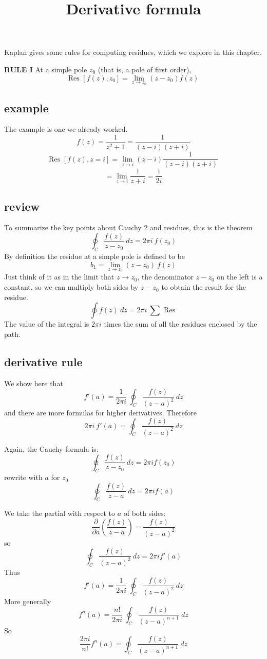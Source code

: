 \documentclass[11pt, oneside]{article}   	%
\title{Derivative formula}
\date{}							%
\begin{document}
\maketitle
\Large

Kaplan gives some rules for computing residues, which we explore in this chapter.

\textbf{RULE I}  At a simple pole $z_0$ (that is, a pole of first order),
\[ \text{Res } [f(z),z_0] = \lim_{z \rightarrow z_0} (z-z_0) f(z) \]

\subsection*{example}
The example is one we already worked.
\[ f(z) = \frac{1}{z^2 + 1} = \frac{1}{(z - i)(z + i)} \]
\[ \text{Res } [f(z),z=i] = \lim_{z \rightarrow i} (z-i) \frac{1}{(z - i)(z + i)} \]
\[ = \lim_{z \rightarrow i} \frac{1}{z + i} = \frac{1}{2i} \]

\subsection*{review}

To summarize the key points about Cauchy 2 and residues, this is the theorem
\[ \oint_C \frac{f(z)}{z - z_0} \ dz = 2 \pi i \ f(z_0) \]
By definition the residue at a simple pole is defined to be
\[ b_1 = \lim_{z \rightarrow z_0} (z-z_0) \ f(z)  \]
Just think of it as in the limit that $z \rightarrow z_0$, the denominator $z-z_0$ on the left is a constant, so we can multiply both sides by $z - z_0$ to obtain the result for the residue.
\[ \oint f(z) \ dz = 2 \pi i \ \sum \text{ Res } \]
The value of the integral is $2 \pi i$ times the sum of all the residues enclosed by the path.

\subsection*{derivative rule}

We show here that
\[ f'(a) = \frac{1}{2 \pi i} \ \oint_C \frac{f(z)}{(z-a)^2} \ dz \]
and there are more formulas for higher derivatives.
Therefore
\[ 2 \pi i \ f'(a) =  \oint_C \frac{f(z)}{(z-a)^2} \ dz \]

Again, the Cauchy formula is:
\[ \oint_C \frac{f(z)}{z-z_0} \ dz = 2 \pi i f(z_0) \]
rewrite with $a$ for $z_0$
\[ \oint_C \frac{f(z)}{z-a} \ dz = 2 \pi i f(a) \]

We take the partial with respect to $a$ of both sides:
\[ \frac{\partial}{\partial a} ( \frac{f(z)}{z-a} ) = \frac{f(z)}{(z-a)^2} \]
so
\[ \oint_C \frac{f(z)}{(z-a)^2} \ dz = 2 \pi i f'(a) \]
Thus
\[ f'(a) = \frac{1}{2 \pi i} \ \oint_C \frac{f(z)}{(z-a)^2} \ dz \]
More generally
\[ f^n(a) = \frac{n!}{2 \pi i} \ \oint_C \frac{f(z)}{(z-a)^{n+1}} \ dz \]
So
\[ \frac{2 \pi i}{n!} f^n(a) = \oint_C \frac{f(z)}{(z-a)^{n+1}} \ dz \]
\end{document}
